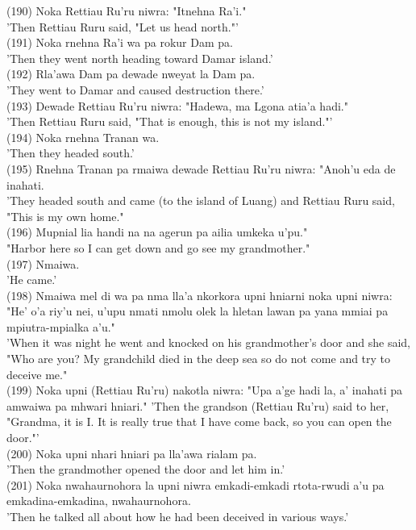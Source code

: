 \documentclass[10pt]{article}
\begin{document}
(190) Noka Rettiau Ru'ru niwra: "Itnehna Ra'i."\\
'Then Rettiau Ruru said, "Let us head north."'\\
(191) Noka rnehna Ra'i wa pa rokur Dam pa.\\
'Then they went north heading toward Damar island.'\\
(192) Rla'awa Dam pa dewade nweyat la Dam pa.\\
'They went to Damar and caused destruction there.'\\
(193) Dewade Rettiau Ru'ru niwra: "Hadewa, ma Lgona atia'a hadi."\\
'Then Rettiau Ruru said, "That is enough, this is not my island."'\\
(194) Noka rnehna Tranan wa.\\
'Then they headed south.'\\
(195) Rnehna Tranan pa rmaiwa dewade Rettiau Ru'ru niwra: "Anoh'u eda de inahati.\\
'They headed south and came (to the island of Luang) and Rettiau Ruru said, "This is my own home."\\
(196) Mupnial lia handi na na agerun pa ailia umkeka u'pu."\\
"Harbor here so I can get down and go see my grandmother."\\
(197) Nmaiwa.\\
'He came.'\\
(198) Nmaiwa mel di wa pa nma lla'a nkorkora upni hniarni noka upni niwra: "He' o'a riy'u nei, u'upu nmati nmolu olek la hletan lawan pa yana mmiai pa mpiutra-mpialka a'u."\\
'When it was night he went and knocked on his grandmother's door and she said, "Who are you? My grandchild died in the deep sea so do not come and try to deceive me."\\
(199) Noka upni (Rettiau Ru'ru) nakotla niwra: "Upa a'ge hadi la, a' inahati pa amwaiwa pa mhwari hniari." 'Then the grandson (Rettiau Ru'ru) said to her, "Grandma, it is I. It is really true that I have come back, so you can open the door."'\\
(200) Noka upni nhari hniari pa lla'awa rialam pa.\\
'Then the grandmother opened the door and let him in.'\\
(201) Noka nwahaurnohora la upni niwra emkadi-emkadi rtota-rwudi a'u pa emkadina-emkadina, nwahaurnohora.\\
'Then he talked all about how he had been deceived in various ways.'\\
\end{document}
